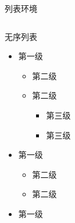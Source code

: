 \documentclass[12pt]{beamer}
\begin{document}
\begin{frame}{列表环境}
    \begin{columns}[T,onlytextwidth]
        \begin{column}{0.48\textwidth}
            \begin{block}{无序列表}
                \begin{itemize}
                    \item 第一级
                    \begin{itemize}
                        \item 第二级
                        \item 第二级
                        \begin{itemize}
                            \item 第三级
                            \item 第三级
                        \end{itemize}
                    \end{itemize}
                    \item 第一级
                    \begin{itemize}
                        \item 第二级
                        \item 第二级
                    \end{itemize}
                    \item 第一级
                \end{itemize}
            \end{block}
        \end{column}
        

\end{columns}
\end{frame}
\end{document}
